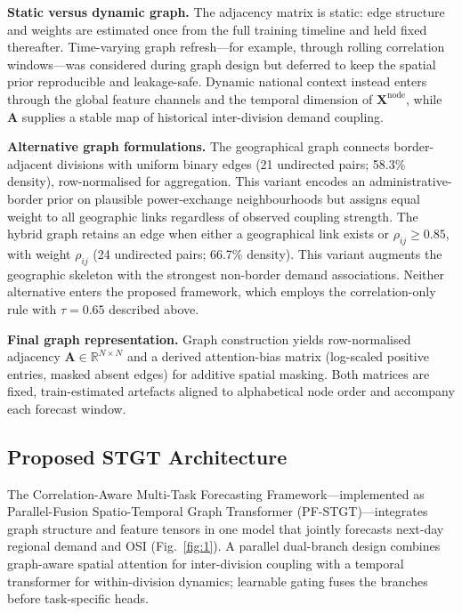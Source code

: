 \textbf{Static versus dynamic graph.} The adjacency matrix is static: edge structure and weights are estimated once from the full training timeline and held fixed thereafter. Time-varying graph refresh---for example, through rolling correlation windows---was considered during graph design but deferred to keep the spatial prior reproducible and leakage-safe. Dynamic national context instead enters through the global feature channels and the temporal dimension of \(\mathbf{X}^{\mathrm{node}}\), while \(\mathbf{A}\) supplies a stable map of historical inter-division demand coupling.

\textbf{Alternative graph formulations.} The geographical graph connects border-adjacent divisions with uniform binary edges (21 undirected pairs; 58.3\% density), row-normalised for aggregation. This variant encodes an administrative-border prior on plausible power-exchange neighbourhoods but assigns equal weight to all geographic links regardless of observed coupling strength. The hybrid graph retains an edge when either a geographical link exists or \(\rho_{ij} \geq 0.85\), with weight \(\rho_{ij}\) (24 undirected pairs; 66.7\% density). This variant augments the geographic skeleton with the strongest non-border demand associations. Neither alternative enters the proposed framework, which employs the correlation-only rule with \(\tau = 0.65\) described above.

\textbf{Final graph representation.} Graph construction yields row-normalised adjacency \(\mathbf{A} \in \mathbb{R}^{N \times N}\) and a derived attention-bias matrix (log-scaled positive entries, masked absent edges) for additive spatial masking. Both matrices are fixed, train-estimated artefacts aligned to alphabetical node order and accompany each forecast window.

\subsection{Proposed STGT Architecture}\label{subsection:proposed_stgt_architecture}

The Correlation-Aware Multi-Task Forecasting Framework---implemented as Parallel-Fusion Spatio-Temporal Graph Transformer (PF-STGT)---integrates graph structure and feature tensors in one model that jointly forecasts next-day regional demand and OSI (Fig.~\ref{fig:1}). A parallel dual-branch design combines graph-aware spatial attention for inter-division coupling with a temporal transformer for within-division dynamics; learnable gating fuses the branches before task-specific heads.

